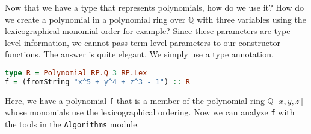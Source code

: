 \documentclass[MS, xcolor=dvipsnames]{wfuthesis}
\def\bQ{\mathbb{Q}}
\theoremstyle{definition}
\begin{document}
Now that we have a type that represents polynomials, how do we use it? How do we create a polynomial in a polynomial ring over $\bQ$ with three variables using the lexicographical monomial order for example? Since these parameters are type-level information, we cannot pass term-level parameters to our constructor functions. The answer is quite elegant. We simply use a type annotation.
\begin{lstlisting}[language=Haskell]
type R = Polynomial RP.Q 3 RP.Lex
f = (fromString "x^5 + y^4 + z^3 - 1") :: R
\end{lstlisting}
Here, we have a polynomial \lstinline{f} that is a member of the polynomial ring $\bQ[x,y,z]$ whose monomials use the lexicographical ordering. Now we can analyze \lstinline{f} with the tools in the \lstinline{Algorithms} module.

\end{document}
